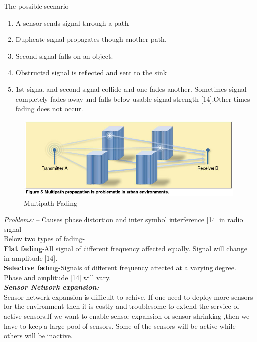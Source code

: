 \documentclass {report}
\begin{document}
The possible scenario-\\

\begin{enumerate}
\item A sensor sends signal through a path.
\item Duplicate signal propagates though another path.
\item Second signal falls on an object.
\item Obstructed signal is reflected and sent to the sink
\item1st signal and second signal collide and one fades another. Sometimes signal completely fades away and falls below usable signal strength [14].Other times fading does not occur.
\end{enumerate}

\begin{figure}
\begin{center}
\includegraphics [scale=0.5]{multipath_fading}
\caption{Multipath Fading}
\end{center}
\end{figure}
\emph{Problems:} – Causes phase distortion and inter symbol interference [14] in radio signal\\
Below two types of fading-\\
{\bfseries Flat fading}-All signal of different frequency affected equally. Signal will change in amplitude [14].\\
{\bfseries Selective fading}-Signals of different frequency affected at a varying degree. Phase and amplitude [14] will vary.\\

{\bfseries \emph{Sensor Network expansion:}\\}Sensor network expansion is difficult to achive. If one need to deploy more sensors for the environment then it is costly and troublesome to extend the service of active sensors.If we want to enable sensor expansion or sensor shrinking ,then we have to keep  a large pool of sensors. Some of the sensors will be active while others will be inactive.
\end{document}
